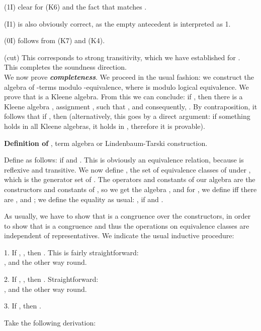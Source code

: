 \documentclass{eptcs}
\begin{document}
(1I) clear for (K6) and the fact that  matches .

(I1) is also obviously correct, as the empty antecedent is interpreted as
1.

(0I) follows from (K7) and (K4). 

(cut) This corresponds to strong transitivity, which we have established for
.
\\

This completes the soundness direction. 
\\

We now prove \textbf{\textit{completeness}}. We proceed in the usual fashion:
we construct the algebra  of -terms modulo -equivalence, 
where  is  modulo logical equivalence. We prove that 
 is a Kleene algebra. From this we can conclude: if 
, then 
there is a Kleene algebra , 
assignment , such  that 
,
and consequently, . By
contraposition, it follows that if ,
then  (alternatively, this goes by a
direct argument: if something holds in all Kleene algebras, it holds
in , therefore it is provable).

\textbf{Definition of }, term algebra 
or Lindenbaum-Tarski construction.

Define  as follows:
 if  and
. This is obviously an equivalence 
relation, because  is reflexive and transitive. 
We now define , 
the set of equivalence classes of  under 
, which is the generator set of . 
The operators and constants of our algebra are 
the constructors and constants of
, so we get the algebra 
, and for 
,
we define  iff there are , and ; we define
the equality 
 as usual: , if  
and . 

As usually, we have to show that  is a congruence over
the constructors, in order to show that  is a congruence
and thus the operations on equivalence classes are independent
of representatives. We indicate the usual inductive procedure:

1. If , , then .
This is fairly straightforward:
\\

, 
and the other way round.

2. If , , then .
Straightforward:
\\

,
and the other way round.

3. If , then .

Take the following derivation:
\\


\\
\end{document}
